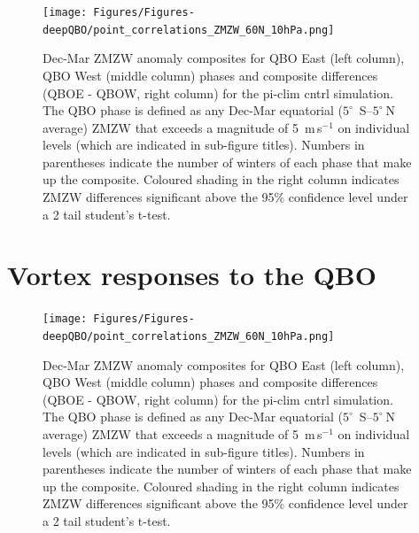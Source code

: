 \begin{figure}[h!]
\begin{center}
\noindent\texttt{[image: Figures/Figures-deepQBO/point\_correlations\_ZMZW\_60N\_10hPa.png]}
\caption[]{Dec-Mar ZMZW anomaly composites for QBO East (left column), QBO West (middle column) phases and composite differences (QBOE - QBOW, right column) for the pi-clim cntrl simulation. The QBO phase is defined as any Dec-Mar equatorial ($5^{\circ}$\ S--$5^{\circ}\ $N average) ZMZW that exceeds a magnitude of 5\ m\,s$^{-1}$ on individual levels (which are indicated in sub-figure titles). Numbers in parentheses indicate the number of winters of each phase that make up the composite. Coloured shading in the right column indicates ZMZW differences significant above the 95\% confidence level under a 2 tail student’s t-test.}
\label{fig:point_cors}
\end{center}
\end{figure}





\section{Vortex responses to the QBO}
\begin{figure}[h!]
\begin{center}
\noindent\texttt{[image: Figures/Figures-deepQBO/point\_correlations\_ZMZW\_60N\_10hPa.png]}
\caption[]{Dec-Mar ZMZW anomaly composites for QBO East (left column), QBO West (middle column) phases and composite differences (QBOE - QBOW, right column) for the pi-clim cntrl simulation. The QBO phase is defined as any Dec-Mar equatorial ($5^{\circ}$\ S--$5^{\circ}\ $N average) ZMZW that exceeds a magnitude of 5\ m\,s$^{-1}$ on individual levels (which are indicated in sub-figure titles). Numbers in parentheses indicate the number of winters of each phase that make up the composite. Coloured shading in the right column indicates ZMZW differences significant above the 95\% confidence level under a 2 tail student’s t-test.}
\label{fig:point_cors}
\end{center}
\end{figure}


